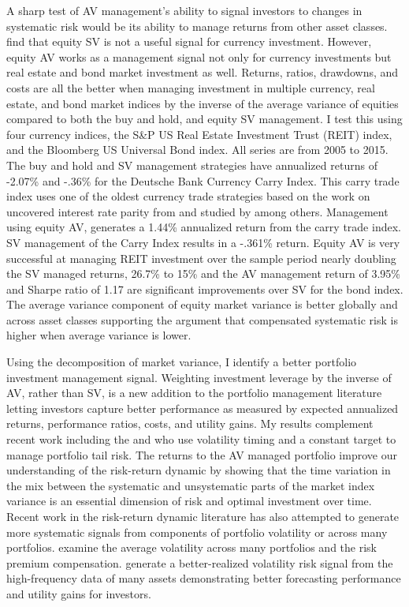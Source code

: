 A sharp test of AV management's ability to signal investors to changes in systematic risk would be its ability to manage returns from other asset classes. \citet{moreira_volatility-managed_2017} find that equity SV is not a useful signal for currency investment. However, equity AV works as a management signal not only for currency investments but real estate and bond market investment as well. Returns, ratios, drawdowns, and costs are all the better when managing investment in multiple currency, real estate, and bond market indices by the inverse of the average variance of equities compared to both the buy and hold, and equity SV management. I test this using four currency indices, the S\&P US Real Estate Investment Trust (REIT) index, and the Bloomberg US Universal Bond index. All series are from 2005 to 2015. The buy and hold and SV management strategies have annualized returns of -2.07\% and -.36\% for the Deutsche Bank Currency Carry Index. This carry trade index uses one of the oldest currency trade strategies based on the work on uncovered interest rate parity from \citet{noauthor_speculative_nodate,fama_forward_1984} and studied by \citet{lustig_cross_2007,brunnermeier_carry_nodate,burnside_carry_2011} among others. Management using equity AV, generates a 1.44\% annualized return from the carry trade index. SV management of the Carry Index results in a -.361\% return.  Equity AV is very successful at managing REIT investment over the sample period nearly doubling the SV managed returns, 26.7\% to 15\% and the AV management return of 3.95\% and Sharpe ratio of 1.17 are significant improvements over SV for the bond index. The average variance component of equity market variance is better globally and across asset classes supporting the argument that compensated systematic risk is higher when average variance is lower. 

Using the decomposition of market variance, I identify a better portfolio investment management signal. Weighting investment leverage by the inverse of AV, rather than SV, is a new addition to the portfolio management literature letting investors capture better performance as measured by expected annualized returns,  performance ratios, costs, and utility gains. My results complement recent work including the \citet{moreira_volatility-managed_2017} and \citet{hocquard_constant-volatility_2013} who use volatility timing and a constant target to manage portfolio tail risk. The returns to the AV managed portfolio improve our understanding of the risk-return dynamic by showing that the time variation in the mix between the systematic and unsystematic parts of the market index variance is an essential dimension of risk and optimal investment over time.  Recent work in the risk-return dynamic literature has also attempted to generate more systematic signals from components of portfolio volatility or across many portfolios. \citet{gonzalez-urteaga_cross-sectional_2016} examine the average volatility across many portfolios and the risk premium compensation. \citet{bollerslev_risk_2017} generate a better-realized volatility risk signal from the high-frequency data of many assets demonstrating better forecasting performance and utility gains for investors. 

